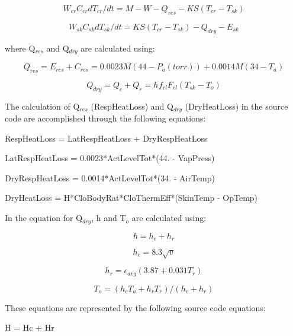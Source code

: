 \begin{equation}
{W_{cr}}{C_{cr}}d{T_{cr}}/dt = M - W - {Q_{res}} - KS({T_{cr}} - {T_{sk}})
\end{equation}

\begin{equation}
{W_{sk}}{C_{sk}}d{T_{sk}}/dt = KS({T_{cr}} - {T_{sk}}) - {Q_{dry}} - {E_{sk}}
\end{equation}

where Q\(_{res}\) and Q\(_{dry}\) are calculated using:

\begin{equation}
{Q_{res}} = {E_{res}} + {C_{res}} = 0.0023M(44 - {P_{a}(torr)}) + 0.0014M(34 - {T_a})
\end{equation}

\begin{equation}
{Q_{dry}} = {Q_c} + {Q_r} = {h_{}}{f_{cl}}{F_{cl}}({T_{sk}} - {T_o})
\label{eq:KSU2NodeQdry}
\end{equation}

The calculation of Q\(_{res}\) (RespHeatLoss) and Q\(_{dry}\) (DryHeatLoss) in the source code are accomplished through the following equations:

RespHeatLoss = LatRespHeatLoss + DryRespHeatLoss

LatRespHeatLoss = 0.0023*ActLevelTot*(44. - VapPress)

DryRespHeatLoss = 0.0014*ActLevelTot*(34. - AirTemp)

DryHeatLoss = H*CloBodyRat*CloThermEff*(SkinTemp - OpTemp)

In the equation for Q\(_{dry}\), h and T\(_{o}\) are calculated using:

\begin{equation}
h = {h_c} + {h_r}
\end{equation}

\begin{equation}
{h_c} = 8.3\sqrt v
\end{equation}

\begin{equation}
{h_r} ={\epsilon_{avg}}(3.87 + 0.031{T_r})
\end{equation}

\begin{equation}
{T_o} = ({h_c}{T_a} + {h_r}{T_r})/({h_c} + {h_r})
\end{equation}

These equations are represented by the following source code equations:

H = Hc + Hr

